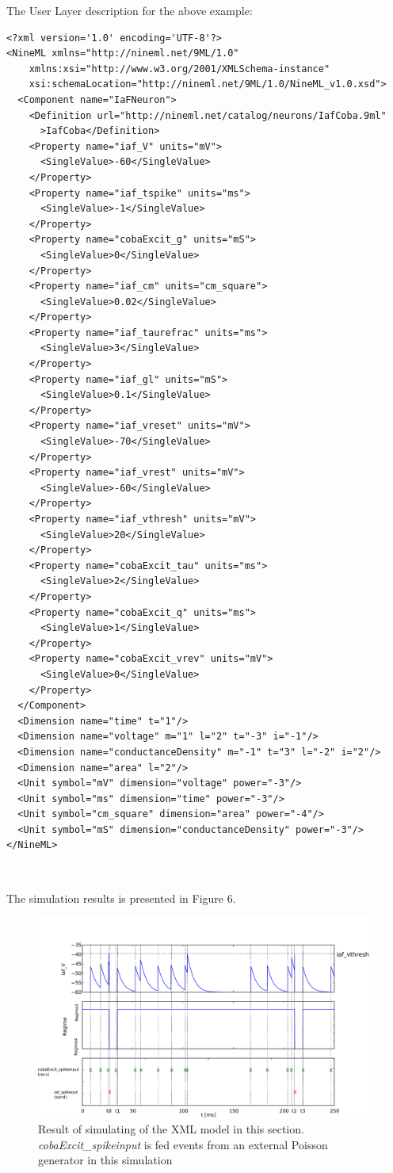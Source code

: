 \documentclass[draftspec]{ninemlspec}
\begin{document}
The User Layer description for the above example:
\begin{lstlisting}[style=XML]
<?xml version='1.0' encoding='UTF-8'?>
<NineML xmlns="http://nineml.net/9ML/1.0"
    xmlns:xsi="http://www.w3.org/2001/XMLSchema-instance"
    xsi:schemaLocation="http://nineml.net/9ML/1.0/NineML_v1.0.xsd">
  <Component name="IaFNeuron">
    <Definition url="http://nineml.net/catalog/neurons/IafCoba.9ml"
      >IafCoba</Definition>
    <Property name="iaf_V" units="mV">
      <SingleValue>-60</SingleValue>
    </Property>
    <Property name="iaf_tspike" units="ms">
      <SingleValue>-1</SingleValue>
    </Property>
    <Property name="cobaExcit_g" units="mS">
      <SingleValue>0</SingleValue>
    </Property>
    <Property name="iaf_cm" units="cm_square">
      <SingleValue>0.02</SingleValue>
    </Property>
    <Property name="iaf_taurefrac" units="ms">
      <SingleValue>3</SingleValue>
    </Property>
    <Property name="iaf_gl" units="mS">
      <SingleValue>0.1</SingleValue>
    </Property>
    <Property name="iaf_vreset" units="mV">
      <SingleValue>-70</SingleValue>
    </Property>
    <Property name="iaf_vrest" units="mV">
      <SingleValue>-60</SingleValue>
    </Property>
    <Property name="iaf_vthresh" units="mV">
      <SingleValue>20</SingleValue>
    </Property>
    <Property name="cobaExcit_tau" units="ms">
      <SingleValue>2</SingleValue>
    </Property>
    <Property name="cobaExcit_q" units="ms">
      <SingleValue>1</SingleValue>
    </Property>
    <Property name="cobaExcit_vrev" units="mV">
      <SingleValue>0</SingleValue>
    </Property>
  </Component>
  <Dimension name="time" t="1"/>
  <Dimension name="voltage" m="1" l="2" t="-3" i="-1"/>
  <Dimension name="conductanceDensity" m="-1" t="3" l="-2" i="2"/>
  <Dimension name="area" l="2"/>
  <Unit symbol="mV" dimension="voltage" power="-3"/>
  <Unit symbol="ms" dimension="time" power="-3"/>
  <Unit symbol="cm_square" dimension="area" power="-4"/>
  <Unit symbol="mS" dimension="conductanceDensity" power="-3"/>
</NineML>
\end{lstlisting}
~

The simulation results is presented in Figure 6.
\begin{figure}[htb!]
\center
\includegraphics[width=14cm]{figures/demo2_Coba1_out.pdf}
\protect\caption{Result of simulating of the XML model in this section.
\emph{cobaExcit\_spikeinput} is fed events from an external Poisson generator
in this simulation}
\label{fig:EX2_Output}
\end{figure}
\end{document}
